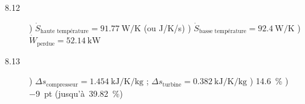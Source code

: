 \begin{description}
		\item [8.12] 	) $\dot{S}_\text{haute température} = \SI{+91,77}{\watt\per\kelvin}$ (ou \si[per-mode = symbol]{\joule\per\kelvin\per\second})
							) $\dot{S}_\text{basse\ température} = \SI{+92,4}{\watt\per\kelvin}$
							) $\dot{W}_\text{perdue} = \SI{+52,14}{\kilo\watt}$
		\item [8.13] 	) $\Delta s_\text{compresseur} = \SI{+1,454}{\kilo\joule\per\kelvin\per\kilogram}$ ; $\Delta s_\text{turbine} = \SI{+0,382}{\kilo\joule\per\kelvin\per\kilogram}$
							) \SI{+14,6}{\percent}
							) \SI{-9}{pt} (jusqu’à~\SI{39,82}{\percent})
	\end{description}
